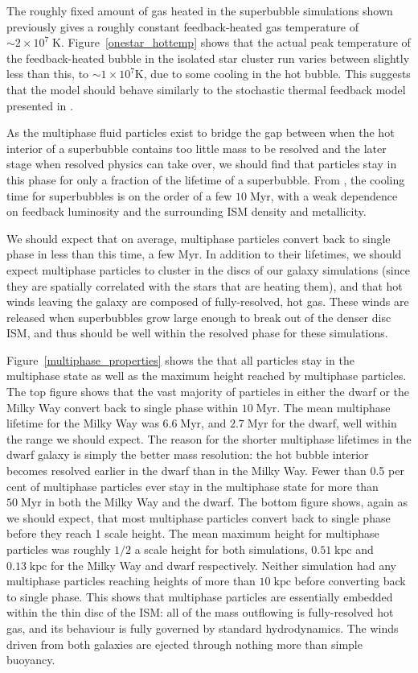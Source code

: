 The roughly fixed amount of gas heated in the superbubble simulations shown
previously gives a roughly constant feedback-heated gas temperature of $\sim
2\times10^7\;\mathrm{K}$.  Figure~\ref{onestar_hottemp}  shows that the actual
peak temperature of the feedback-heated bubble in the isolated star cluster run
varies between slightly less than this, to $\sim 1\times10^7\mathrm{K}$,
due to some cooling in the hot bubble.  This suggests that the model should
behave similarly to the stochastic thermal feedback model presented in
\citet{DallaVecchia2012}.  

As the multiphase fluid particles exist to bridge the gap between when the hot
interior of a superbubble contains too little mass to be resolved and the later
stage when resolved physics can take over, we should find that particles stay in
this phase for only a fraction of the lifetime of a superbubble.  From
\citet{MacLow1988}, the cooling time for superbubbles is on the order of a few
$10\;\mathrm{Myr}$, with a weak dependence on feedback luminosity and the
surrounding ISM density and metallicity.

We should expect that on average, multiphase particles convert back to single
phase in less than this time, a few $\mathrm{Myr}$.  In addition to their
lifetimes, we should expect multiphase particles to cluster in the discs of our
galaxy simulations (since they are spatially correlated with the stars that are
heating them), and that hot winds leaving the galaxy are composed of
fully-resolved, hot gas.  These winds are released when superbubbles grow large
enough to break out of the denser disc ISM, and thus should be well within the
resolved phase for these simulations.

Figure~\ref{multiphase_properties} shows the that all particles stay in
the multiphase state as well as the maximum height reached by multiphase
particles.  The top figure shows that the vast majority of particles in either
the dwarf or the Milky Way convert back to single phase within
$10\;\mathrm{Myr}$.  The mean multiphase lifetime for the Milky Way was
$6.6\;\mathrm{Myr}$, and $2.7\;\mathrm{Myr}$ for the dwarf, well within the
range we should expect.  The reason for the shorter multiphase lifetimes in the
dwarf galaxy is simply the better mass resolution: the hot bubble interior
becomes resolved earlier in the dwarf than in the Milky Way.  Fewer than 0.5 per
cent of multiphase particles ever stay in the multiphase state for more than
$50\;\mathrm{Myr}$ in both the Milky Way and the dwarf.  The bottom figure
shows, again as we should expect, that most multiphase particles convert back to
single phase before they reach 1 scale height.  The mean maximum height for
multiphase particles was roughly $1/2$ a scale height for both simulations,
$0.51\;\mathrm{kpc}$ and $0.13\;\mathrm{kpc}$ for the Milky Way and dwarf
respectively.  Neither simulation had any multiphase particles reaching heights
of more than $10\;\mathrm{kpc}$ before converting back to single phase.  This
shows that multiphase particles are essentially embedded within the thin disc of
the ISM: all of the mass outflowing is fully-resolved hot gas, and its behaviour
is fully governed by standard hydrodynamics.  The winds driven from both
galaxies are ejected through nothing more than simple buoyancy.


